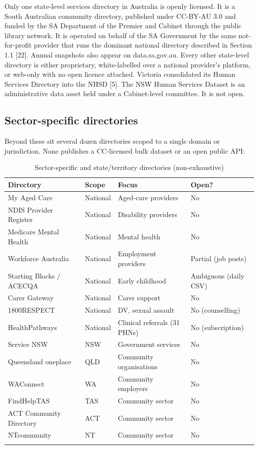 \documentclass[11pt,a4paper]{article}
\newcommand{\theadstyle}{\cellcolor{headerbg}\textbf}
\begin{document}
Only one state-level services directory in Australia is openly licensed. It is a South Australian community directory, published under CC-BY-AU 3.0 and funded by the SA Department of the Premier and Cabinet through the public library network. It is operated on behalf of the SA Government by the same not-for-profit provider that runs the dominant national directory described in Section 1.1 [22]. Annual snapshots also appear on data.sa.gov.au. Every other state-level directory is either proprietary, white-labelled over a national provider's platform, or web-only with no open licence attached. Victoria consolidated its Human Services Directory into the NHSD [5]. The NSW Human Services Dataset is an administrative data asset held under a Cabinet-level committee. It is not open.

\subsection{Sector-specific directories}

Beyond these sit several dozen directories scoped to a single domain or jurisdiction. None publishes a CC-licensed bulk dataset or an open public API:

\begin{longtable}{@{}llp{4.5cm}l@{}}
\toprule
\rowcolor{headerbg} \theadstyle{Directory} & \theadstyle{Scope} & \theadstyle{Focus} & \theadstyle{Open?} \\
\midrule
\endhead
My Aged Care & National & Aged-care providers & No \\
NDIS Provider Register & National & Disability providers & No \\
Medicare Mental Health & National & Mental health & No \\
Workforce Australia & National & Employment providers & Partial (job posts) \\
Starting Blocks / ACECQA & National & Early childhood & Ambiguous (daily CSV) \\
Carer Gateway & National & Carer support & No \\
1800RESPECT & National & DV, sexual assault & No (counselling) \\
HealthPathways & National & Clinical referrals (31 PHNs) & No (subscription) \\
Service NSW & NSW & Government services & No \\
Queensland oneplace & QLD & Community organisations & No \\
WAConnect & WA & Community employers & No \\
FindHelpTAS & TAS & Community sector & No \\
ACT Community Directory & ACT & Community sector & No \\
NTcommunity & NT & Community sector & No \\
\bottomrule
\caption{Sector-specific and state/territory directories (non-exhaustive)}
\end{longtable}
\end{document}
